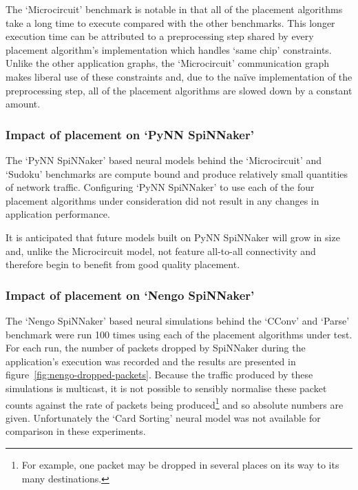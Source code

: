 				The `Microcircuit' benchmark is notable in that all of the placement
				algorithms take a long time to execute compared with the other
				benchmarks. This longer execution time can be attributed to a
				preprocessing step shared by every placement algorithm's implementation
				which handles `same chip' constraints. Unlike the other application
				graphs, the `Microcircuit' communication graph makes liberal use of
				these constraints and, due to the na\"ive implementation of the
				preprocessing step, all of the placement algorithms are slowed down by
				a constant amount.
			
			\subsubsection{Impact of placement on `PyNN SpiNNaker'}
				
				The `PyNN SpiNNaker' based neural models behind the `Microcircuit' and
				`Sudoku' benchmarks are compute bound and produce relatively small
				quantities of network traffic. Configuring `PyNN SpiNNaker' to use each
				of the four placement algorithms under consideration did not result in
				any changes in application performance.
				
				It is anticipated that future models built on PyNN SpiNNaker will grow
				in size and, unlike the Microcircuit model, not feature all-to-all
				connectivity and therefore begin to benefit from good quality
				placement.
			
			\subsubsection{Impact of placement on `Nengo SpiNNaker'}
				
				The `Nengo SpiNNaker' based neural simulations behind the `CConv' and
				`Parse' benchmark were run \num{100} times using each of the placement
				algorithms under test. For each run, the number of packets dropped by
				SpiNNaker during the application's execution was recorded and the
				results are presented in figure~\ref{fig:nengo-dropped-packets}.
				Because the traffic produced by these simulations is multicast, it is
				not possible to sensibly normalise these packet counts against the rate
				of packets being produced\footnote{For example, one packet may be
				dropped in several places on its way to its many destinations.} and so
				absolute numbers are given. Unfortunately the `Card Sorting' neural
				model was not available for comparison in these experiments.
				
